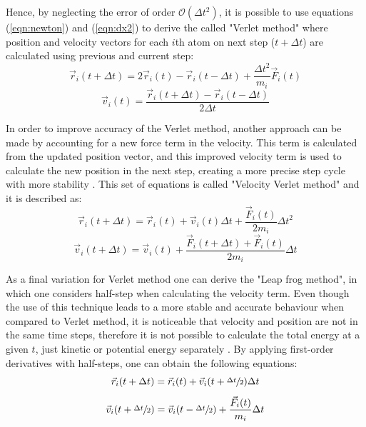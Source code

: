 \documentclass[10pt,a4paper,twoside]{article}
\begin{document}
Hence, by neglecting the error of order $\mathcal{O}(\Delta t^2)$, it is possible to use equations (\ref{eqn:newton}) and (\ref{eqn:dx2}) to derive the called "Verlet method" where position and velocity vectors for each $i$th atom on next step ($t+\Delta t$) are calculated using previous and current step:
\begin{equation}
\vec{r}_i(t+\Delta t) = 2 \vec{r}_i(t) - \vec{r}_i(t-\Delta t) + \dfrac{{\Delta t}^2}{m_i}\vec{F}_i(t)
\label{eqn:verletr}
\end{equation}
\begin{equation}
\vec{v}_i(t) =  \dfrac{\vec{r}_i(t+\Delta t) - \vec{r}_i(t-\Delta t)}{2{\Delta t}}
\label{eqn:verletv}
\end{equation}

In order to improve accuracy of the Verlet method, another approach can be made by accounting for a new force term in the velocity. This term is calculated from the updated position vector, and this improved velocity term is used to calculate the new position in the next step, creating a more precise step cycle with more stability \cite{satoh}. This set of equations is called "Velocity Verlet method" and it is described as:
\begin{equation}
\vec{r}_i(t+\Delta t) = \vec{r}_i(t) + \vec{v}_i(t)\Delta t + \dfrac{\vec{F}_i(t)}{2m_i}{\Delta t}^2
\label{eqn:vverletr}
\end{equation}
\begin{equation}
\vec{v}_i(t+\Delta t) = \vec{v}_i(t) + \dfrac{\vec{F}_i(t+\Delta t)+\vec{F}_i(t)}{2m_i}\Delta t
\label{eqn:vverletv}
\end{equation}

As a final variation for Verlet method one can derive the "Leap frog method", in which one considers half-step when calculating the velocity term. Even though the use of this technique leads to a more stable and accurate behaviour when compared to Verlet method, it is noticeable that velocity and position are not in the same time steps, therefore it is not possible to calculate the total energy at a given $t$, just kinetic or potential energy separately \cite{umd}. By applying first-order derivatives with half-steps, one can obtain the following equations:
\begin{equation}
\vec{r}_i(t+\Delta t) = \vec{r}_i(t) + \vec{v}_i(t+\sfrac{\Delta t}{2})\Delta t
\label{eqn:leapfrogr}
\end{equation}
\begin{equation}
\vec{v}_i(t+\sfrac{\Delta t}{2}) = \vec{v}_i(t-\sfrac{\Delta t}{2}) + \dfrac{\vec{F}_i(t)}{m_i}\Delta t
\label{eqn:leapfrogv}
\end{equation}
\end{document}
